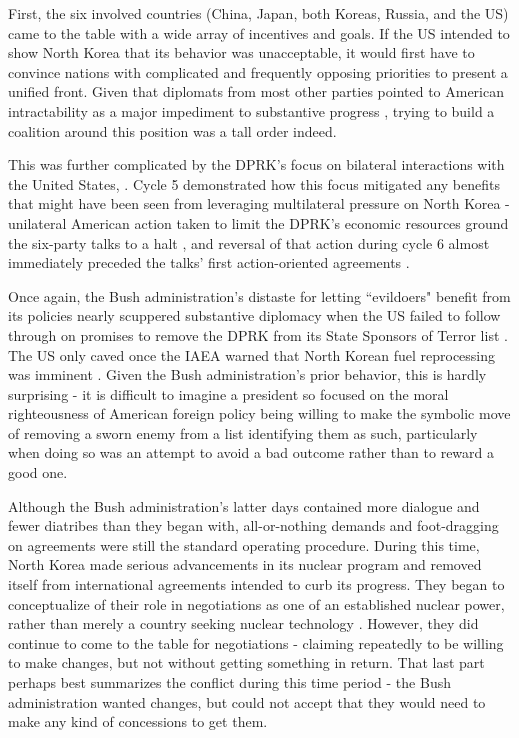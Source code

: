 First, the six involved countries (China, Japan, both Koreas, Russia, and the US) came to the table with a wide array of incentives and goals. If the US intended to show North Korea that its behavior was unacceptable, it would first have to convince nations with complicated and frequently opposing priorities to present a unified front. Given that diplomats from most other parties pointed to American intractability as a major impediment to substantive progress \cite{park6pt}, trying to build a coalition around this position was a tall order indeed.

This was further complicated by the DPRK's focus on bilateral interactions with the United States, \cite{rich14,park6pt}. Cycle 5 demonstrated how this focus mitigated any benefits that might have been seen from leveraging multilateral pressure on North Korea - unilateral American action taken to limit the DPRK's economic resources ground the six-party talks to a halt \cite{greenlees}, and reversal of that action during cycle 6 almost immediately preceded the talks' first action-oriented agreements \cite{js5,js6}. 

Once again, the Bush administration's distaste for letting ``evildoers" benefit from its policies nearly scuppered substantive diplomacy when the US failed to follow through on promises to remove the DPRK from its State Sponsors of Terror list \cite{nti15}. The US only caved once the IAEA warned that North Korean fuel reprocessing was imminent \cite{iaea09}. Given the Bush administration's prior behavior, this is hardly surprising - it is difficult to imagine a president so focused on the moral righteousness of American foreign policy being willing to make the symbolic move of removing a sworn enemy from a list identifying them as such, particularly when doing so was an attempt to avoid a bad outcome rather than to reward a good one.

Although the Bush administration's latter days contained more dialogue and fewer diatribes than they began with, all-or-nothing demands and foot-dragging on agreements were still the standard operating procedure. During this time, North Korea made serious advancements in its nuclear program and removed itself from international agreements intended to curb its progress. They began to conceptualize of their role in negotiations as one of an established nuclear power, rather than merely a country seeking nuclear technology \cite{hecker2}. However, they did continue to come to the table for negotiations - claiming repeatedly to be willing to make changes, but not without getting something in return. That last part perhaps best summarizes the conflict during this time period - the Bush administration wanted changes, but could not accept that they would need to make any kind of concessions to get them.

